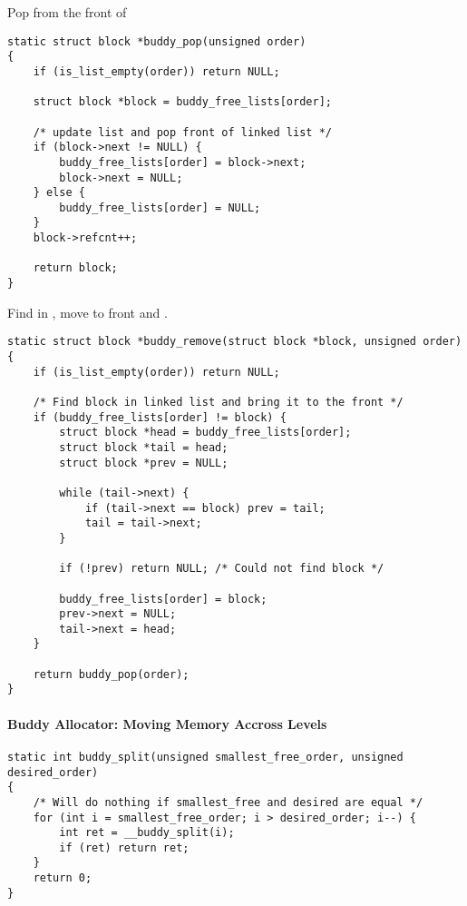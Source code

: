 \newpar{}

Pop from the front of 
\begin{lstlisting}[style=bright_C++]
static struct block *buddy_pop(unsigned order)
{
    if (is_list_empty(order)) return NULL;

    struct block *block = buddy_free_lists[order];

    /* update list and pop front of linked list */
    if (block->next != NULL) {
        buddy_free_lists[order] = block->next;
        block->next = NULL;
    } else {
        buddy_free_lists[order] = NULL;
    }
    block->refcnt++;

    return block;
}
\end{lstlisting}

\newpar{}

Find  in  , move to front and .
\begin{lstlisting}[style=bright_C++]
static struct block *buddy_remove(struct block *block, unsigned order)
{
	if (is_list_empty(order)) return NULL;

	/* Find block in linked list and bring it to the front */
	if (buddy_free_lists[order] != block) {
		struct block *head = buddy_free_lists[order];
		struct block *tail = head;
		struct block *prev = NULL;

		while (tail->next) {
			if (tail->next == block) prev = tail;
			tail = tail->next;
		}

		if (!prev) return NULL; /* Could not find block */

		buddy_free_lists[order] = block;
		prev->next = NULL;
		tail->next = head;
	}

	return buddy_pop(order);
}
\end{lstlisting}

\paragraph{Buddy Allocator: Moving Memory Accross Levels}
\begin{lstlisting}[style=bright_C++]
static int buddy_split(unsigned smallest_free_order, unsigned desired_order)
{
	/* Will do nothing if smallest_free and desired are equal */
	for (int i = smallest_free_order; i > desired_order; i--) {
		int ret = __buddy_split(i);
		if (ret) return ret;
	}
	return 0;
}
\end{lstlisting}

